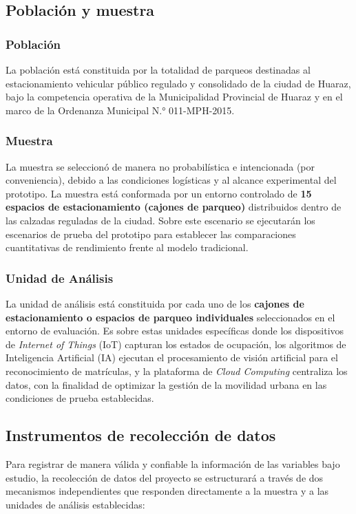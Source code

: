 \documentclass[12pt,a4paper]{article}
\begin{document}
\subsection{Población y muestra}

\subsubsection{Población}
La población está constituida por la totalidad de parqueos destinadas al estacionamiento vehicular público regulado y consolidado de la ciudad de Huaraz, bajo la competencia operativa de la Municipalidad Provincial de Huaraz y en el marco de la Ordenanza Municipal N.° 011-MPH-2015.

\subsubsection{Muestra}
La muestra se seleccionó de manera no probabilística e intencionada (por conveniencia), debido a las condiciones logísticas y al alcance experimental del prototipo. La muestra está conformada por un entorno controlado de \textbf{15 espacios de estacionamiento (cajones de parqueo)} distribuidos dentro de las calzadas reguladas de la ciudad. Sobre este escenario se ejecutarán los escenarios de prueba del prototipo para establecer las comparaciones cuantitativas de rendimiento frente al modelo tradicional.

\subsubsection{Unidad de Análisis}
La unidad de análisis está constituida por cada uno de los \textbf{cajones de estacionamiento o espacios de parqueo individuales} seleccionados en el entorno de evaluación. Es sobre estas unidades específicas donde los dispositivos de \textit{Internet of Things} (IoT) capturan los estados de ocupación, los algoritmos de Inteligencia Artificial (IA) ejecutan el procesamiento de visión artificial para el reconocimiento de matrículas, y la plataforma de \textit{Cloud Computing} centraliza los datos, con la finalidad de optimizar la gestión de la movilidad urbana en las condiciones de prueba establecidas.

\subsection{Instrumentos de recolección de datos}

Para registrar de manera válida y confiable la información de las variables bajo estudio, la recolección de datos del proyecto se estructurará a través de dos mecanismos independientes que responden directamente a la muestra y a las unidades de análisis establecidas:
\end{document}
